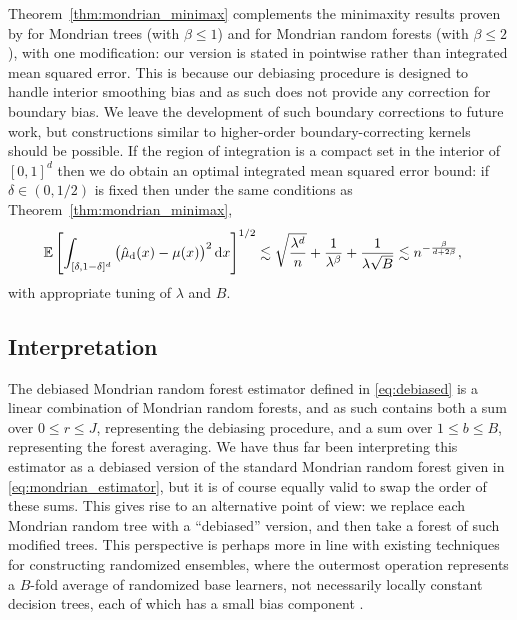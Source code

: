 Theorem~\ref{thm:mondrian_minimax} complements the minimaxity results proven by
\citet{mourtada2020minimax} for Mondrian trees (with $\beta \leq 1$) and for
Mondrian random forests (with $\beta \leq 2$), with one modification: our
version is stated in pointwise rather than integrated mean squared error. This
is because our debiasing procedure is designed to handle interior smoothing
bias and as such does not provide any correction for boundary bias. We leave
the development of such boundary corrections to future work, but constructions
similar to higher-order boundary-correcting kernels should be possible. If the
region of integration is a compact set in the interior of $[0,1]^d$ then we do
obtain an optimal integrated mean squared error bound: if $\delta \in (0, 1/2)$
is fixed then under the same conditions as Theorem~\ref{thm:mondrian_minimax},
%
\begin{align*}
  \mathbb{E} \left[
    \int_{[\delta, 1-\delta]^d}
    \big(
      \hat \mu_{\mathrm{d}}(x)
      - \mu(x)
    \big)^2
    \,\mathrm{d}x
  \right]^{1/2}
  &\lesssim
  \sqrt{\frac{\lambda^d}{n}}
  + \frac{1}{\lambda^\beta}
  + \frac{1}{\lambda \sqrt B}
  \lesssim
  n^{-\frac{\beta}{d + 2 \beta}},
\end{align*}
%
with appropriate tuning of $\lambda$ and $B$.

\subsection{Interpretation}

The debiased Mondrian random forest estimator defined in \eqref{eq:debiased} is
a linear combination of Mondrian random forests, and as such contains both a
sum over $0 \leq r \leq J$, representing the debiasing procedure, and a sum
over $1 \leq b \leq B$, representing the forest averaging. We have thus far
been interpreting this estimator as a debiased version of the standard Mondrian
random forest given in \eqref{eq:mondrian_estimator}, but it is of course
equally valid to swap the order of these sums. This gives rise to an
alternative point of view: we replace each Mondrian random tree with a
``debiased'' version, and then take a forest of such modified trees. This
perspective is perhaps more in line with existing techniques for constructing
randomized ensembles, where the outermost operation represents a $B$-fold
average of randomized base learners, not necessarily locally constant decision
trees, each of which has a small bias component \citep{caruana2004ensemble,
zhou2019deep, friedberg2020local}.

